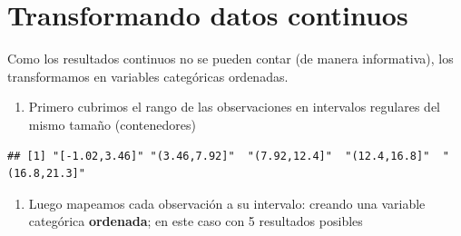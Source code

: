\documentclass[
]{book}
\providecommand{\tightlist}{%
  \setlength{\itemsep}{0pt}\setlength{\parskip}{0pt}}
\begin{document}
\hypertarget{transformando-datos-continuos}{%
\section{Transformando datos continuos}\label{transformando-datos-continuos}}

Como los resultados continuos no se pueden contar (de manera informativa), los transformamos en variables categóricas ordenadas.

\begin{enumerate}
\def\labelenumi{\arabic{enumi})}
\tightlist
\item
  Primero cubrimos el rango de las observaciones en intervalos regulares del mismo tamaño (contenedores)
\end{enumerate}

\begin{verbatim}
## [1] "[-1.02,3.46]" "(3.46,7.92]"  "(7.92,12.4]"  "(12.4,16.8]"  "(16.8,21.3]"
\end{verbatim}

\begin{enumerate}
\def\labelenumi{\arabic{enumi})}
\setcounter{enumi}{1}
\tightlist
\item
  Luego mapeamos cada observación a su intervalo: creando una variable categórica \textbf{ordenada}; en este caso con 5 resultados posibles
\end{enumerate}
\end{document}
